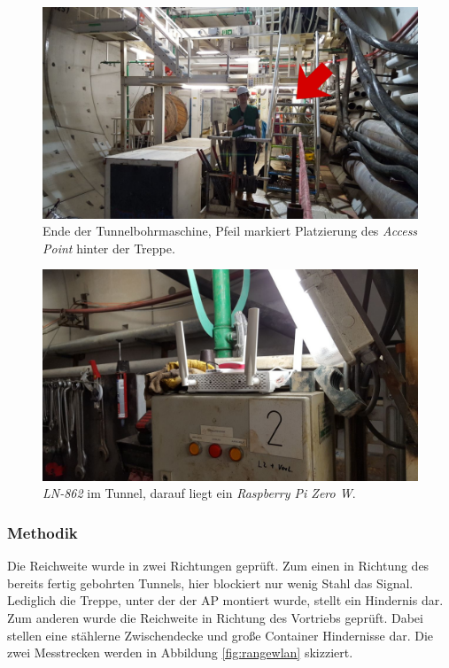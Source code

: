 \begin{figure}[h]
  \centering
	\includegraphics[width=\textwidth]{images/tunnelmark.png}
  \caption{Ende der Tunnelbohrmaschine, Pfeil markiert Platzierung des \emph{Access Point} hinter der Treppe.}
  \label{fig:tunnelmark}
\end{figure}

\begin{figure}[h]
  \centering
	\includegraphics[width=\textwidth]{images/applacement.jpg}
  \caption{\emph{LN-862} im Tunnel, darauf liegt ein \emph{Raspberry Pi Zero W}.}
  \label{fig:applacement}
\end{figure}

\subsubsection{Methodik}
Die Reichweite wurde in zwei Richtungen geprüft.
Zum einen in Richtung des bereits fertig gebohrten Tunnels, hier blockiert nur wenig Stahl das Signal. 
Lediglich die Treppe, unter der der AP montiert wurde, stellt ein Hindernis dar.
Zum anderen wurde die Reichweite in Richtung des Vortriebs geprüft.
Dabei stellen eine stählerne Zwischendecke und große Container Hindernisse dar.
Die zwei Messtrecken werden in Abbildung \ref{fig:rangewlan} skizziert.

